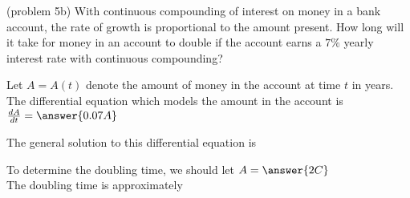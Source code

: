 \documentclass[handout]{ximera}
\begin{document}
\begin{problem}(problem 5b)
With continuous compounding of interest on money in a bank account, the rate of growth is proportional to the amount present.
How long will it take for money in an account to double if the account earns a $7\%$ yearly interest rate with continuous compounding?



Let $A= A(t)$ denote the amount of money in the account at time  $t$  in years.\\
The differential equation which models the amount in the account is\\

$\frac{dA}{dt} = \answer{0.07A}$

The general solution to this differential equation is 

\begin{multipleChoice}
\end{multipleChoice}

To determine the doubling time, we should let $A = \answer{2C}$\\

The doubling time is approximately

\begin{multipleChoice}
\end{multipleChoice}

\end{problem}
\end{document}
